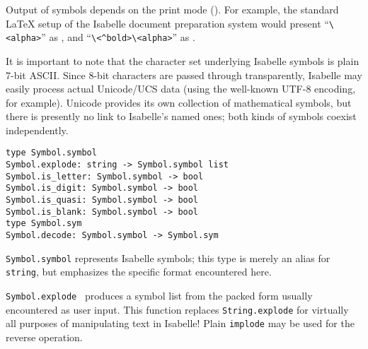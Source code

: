 \begin{isabellebody}
\begin{isamarkuptext}
Output of symbols depends on the print mode ().
For example, the standard {\LaTeX} setup of the Isabelle document
preparation system would present ``\verb,\,\verb,<alpha>,'' as \isa{{\isasymalpha}}, and ``\verb,\,\verb,<^bold>,\verb,\,\verb,<alpha>,'' as \isa{\isactrlbold {\isasymalpha}}.

\medskip It is important to note that the character set underlying
Isabelle symbols is plain 7-bit ASCII.  Since 8-bit characters are
passed through transparently, Isabelle may easily process actual
Unicode/UCS data (using the well-known UTF-8 encoding, for example).
Unicode provides its own collection of mathematical symbols, but there
is presently no link to Isabelle's named ones; both kinds of symbols
coexist independently.%
\end{isamarkuptext}%
\isamarkuptrue%
%
\isadelimmlref
%
\endisadelimmlref
%
\isatagmlref
%
\begin{isamarkuptext}%
\begin{mldecls}
  \verb|type Symbol.symbol| \\
  \verb|Symbol.explode: string -> Symbol.symbol list| \\
  \verb|Symbol.is_letter: Symbol.symbol -> bool| \\
  \verb|Symbol.is_digit: Symbol.symbol -> bool| \\
  \verb|Symbol.is_quasi: Symbol.symbol -> bool| \\
  \verb|Symbol.is_blank: Symbol.symbol -> bool| \\
  \verb|type Symbol.sym| \\
  \verb|Symbol.decode: Symbol.symbol -> Symbol.sym| \\
  \end{mldecls}

  \begin{description}

  \item \verb|Symbol.symbol| represents Isabelle symbols; this type
  is merely an alias for \verb|string|, but emphasizes the
  specific format encountered here.

  \item \verb|Symbol.explode|~ produces a symbol list from
  the packed form usually encountered as user input.  This function
  replaces \verb|String.explode| for virtually all purposes of
  manipulating text in Isabelle!  Plain \verb|implode| may be used
  for the reverse operation.


\end{description}
\end{isamarkuptext}
\end{isabellebody}
